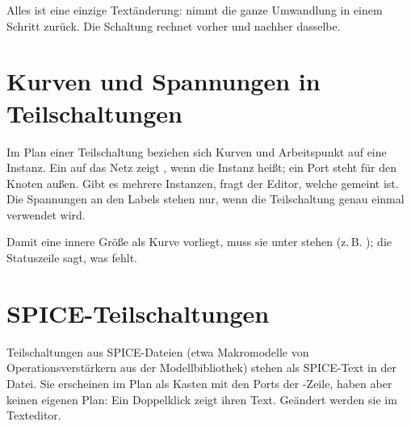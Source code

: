 Alles ist eine einzige Textänderung:  nimmt die ganze
Umwandlung in einem Schritt zurück. Die Schaltung rechnet vorher und
nachher dasselbe.

\section{Kurven und Spannungen in Teilschaltungen}

Im Plan einer Teilschaltung beziehen sich Kurven und Arbeitspunkt auf eine
Instanz. Ein  auf das Netz  zeigt
, wenn die Instanz  heißt; ein Port steht für den
Knoten außen. Gibt es mehrere Instanzen, fragt der Editor, welche gemeint
ist. Die Spannungen an den Labels stehen nur, wenn die Teilschaltung genau
einmal verwendet wird.

Damit eine innere Größe als Kurve vorliegt, muss sie unter
 stehen (z.\,B. ); die Statuszeile sagt,
was fehlt.

\section{SPICE-Teilschaltungen}

Teilschaltungen aus SPICE-Dateien (etwa Makromodelle von Operationsverstärkern
aus der Modellbibliothek) stehen als SPICE-Text in der Datei. Sie
erscheinen im Plan als Kasten mit den Ports der -Zeile, haben
aber keinen eigenen Plan: Ein Doppelklick zeigt ihren Text. Geändert werden
sie im Texteditor.
